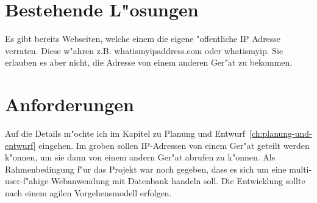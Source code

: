 \section{Bestehende L{"o}sungen}\label{sec:bestehende-losungen}
Es gibt bereits Webseiten, welche einem die eigene {"o}ffentliche IP Adresse verraten.
Diese w{"a}hren z.B. whatismyipaddress.com\cite{whatismyipaddress} oder whatismyip\cite{whatismyip}.
Sie erlauben es aber nicht, die Adresse von einem anderen Ger{"a}t zu bekommen.

\section{Anforderungen}\label{sec:anforderungen}
Auf die Details m{"o}chte ich im Kapitel zu Planung und Entwurf~\ref{ch:planung-und-entwurf} eingehen.
Im groben sollen IP-Adressen von einem Ger{"a}t geteilt werden k{"o}nnen, um sie dann von einem andern Ger{"a}t abrufen zu k{"o}nnen.
Als Rahmenbedingung f{"u}r das Projekt war noch gegeben, dass es sich um eine multi-user-f{"a}hige Webanwendung mit Datenbank handeln soll.
Die Entwicklung sollte nach einem agilen Vorgehensmodell erfolgen.


